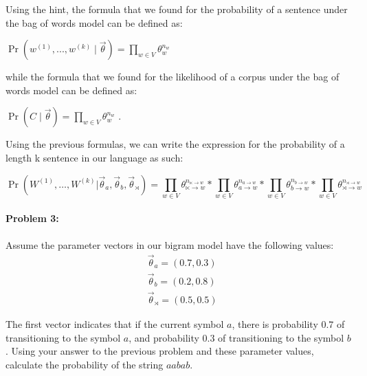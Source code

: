 \documentclass[10pt]{article}
\newenvironment{AnswerBox}{\begin{mdframed}[style=simple]}{\end{mdframed}}
\begin{document}
\begin{AnswerBox}%
Using the hint, the formula that we found for the probability of a sentence under the bag of words model can be defined as: 

$
\Pr(w^{(1)},...,w^{(k)}\mid \vec{\theta}) = \prod_{w\in V} \theta_{w}^{n_{w}}
$

while the formula that we found for the likelihood of a corpus under the bag of words model can be defined as: 

$
\Pr(C \mid \vec{\theta}) = \prod_{w \in V} \theta_{w}^{n_{w}}
$ .

Using the previous formulas, we can write the expression for the probability of a length k sentence in our language as such:

\begin{equation*}
\Pr(W^{(1)},\dots,W^{(k)} | \vec{\theta}_{a}, \vec{\theta}_{b}, \vec{\theta}_{\rtimes}) = 
\prod_{w \in V} \theta_{\ltimes \rightarrow w}^{n_{\ltimes \rightarrow w}} *
\prod_{w \in V} \theta_{a \rightarrow w}^{n_{a \rightarrow w}} *
\prod_{w \in V} \theta_{b \rightarrow w}^{n_{b \rightarrow w}} *
\prod_{w \in V} \theta_{\rtimes \rightarrow w}^{n_{\rtimes \rightarrow w}}
\end{equation*}


    
\end{AnswerBox}%

\hrulefill %

\paragraph{Problem 3:}


Assume the parameter vectors in our bigram model have the following values:
\begin{align*}
&\vec{\theta}_{a} = (0.7,0.3)\\
&\vec{\theta}_{b} = (0.2,0.8)\\
&\vec{\theta}_{\rtimes} = (0.5,0.5)
\end{align*}

 The first vector indicates that if the current symbol $a$,
there is probability $0.7$ of transitioning to the symbol $a$, and
probability $0.3$ of transitioning to the symbol $b$. Using your
answer to the previous problem and these parameter values, calculate
the probability of the string $aabab$.
\end{document}
